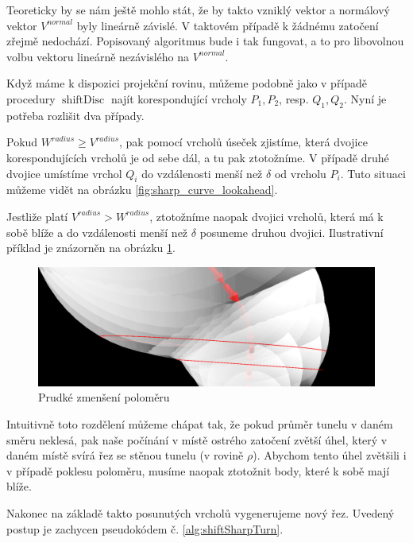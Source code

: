 Teoreticky by se nám ještě mohlo stát, že by takto vzniklý vektor a normálový
vektor $ V^{normal} $ byly lineárně závislé. V taktovém případě k žádnému
zatočení zřejmě nedochází. Popisovaný algoritmus bude i tak fungovat,
a to pro libovolnou volbu vektoru lineárně nezávislého na $ V^{normal} $.

Když máme k dispozici projekční rovinu, můžeme podobně jako v případě
procedury $ \operatorname{shiftDisc} $ najít korespondující
vrcholy $ P_1, P_2 $, resp. $ Q_1, Q_2 $. Nyní je potřeba rozlišit dva případy.

Pokud $ W^{radius} \geq V^{radius} $, pak pomocí vrcholů úseček zjistíme, která
dvojice korespondujících vrcholů je od sebe dál, a tu pak ztotožníme. V případě
druhé dvojice umístíme vrchol $Q_i $ do vzdálenosti menší než $\delta$ od vrcholu
$ P_i $. Tuto situaci můžeme vidět na obrázku \ref{fig:sharp_curve_lookahead}.

Jestliže platí $ V^{radius} > W^{radius} $, ztotožníme naopak dvojici vrcholů,
která má k sobě blíže a do vzdálenosti menší než $\delta$ posuneme druhou dvojici.
Ilustrativní příklad je znázorněn na obrázku \ref{fig:sharp_curve_lookahead_decrease}.

\begin{figure}[ht]
    \centering
    \includegraphics[width=\textwidth]{img/sharp_curve_lookahead_decrease.png}
    \caption{Prudké zmenšení poloměru}
  \centering
  \label{fig:sharp_curve_lookahead_decrease}
\end{figure}

Intuitivně toto rozdělení můžeme chápat tak, že pokud průměr tunelu v daném směru
neklesá, pak naše počínání v místě ostrého zatočení zvětší úhel, který v daném
místě svírá řez se stěnou tunelu (v rovině $ \rho $). Abychom tento úhel zvětšili
i v případě poklesu poloměru, musíme naopak ztotožnit body, které k sobě mají
blíže.

Nakonec na základě takto posunutých vrcholů vygenerujeme nový řez. Uvedený
postup je zachycen pseudokódem č. \ref{alg:shiftSharpTurn}.

